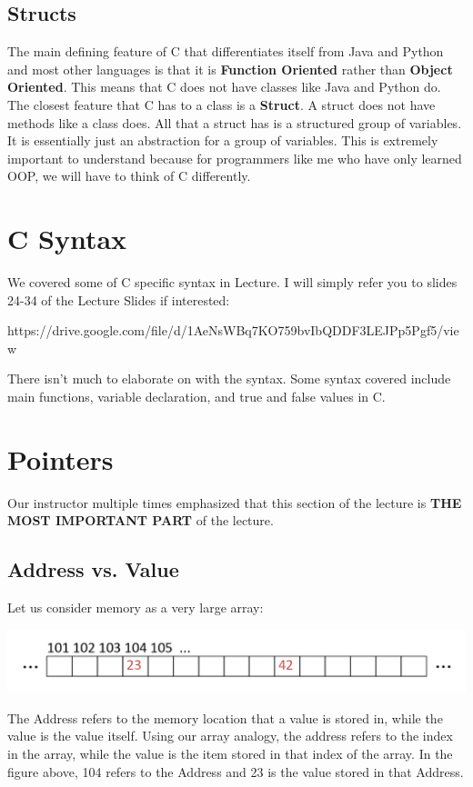 \documentclass[letterpaper]{article}
\theoremstyle{remark}
\begin{document}
\subsection{Structs}
The main defining feature of C that differentiates itself from Java and Python and most other languages is that it is \textbf{Function Oriented} rather than \textbf{Object Oriented}. This means that C does not have classes like Java and Python do. The closest feature that C has to a class is a \textbf{Struct}. A struct does not have methods like a class does. All that a struct has is a structured group of variables. It is essentially just an abstraction for a group of variables. This is extremely important to understand because for programmers like me who have only learned OOP, we will have to think of C differently.

\section{C Syntax}
We covered some of C specific syntax in Lecture. I will simply refer you to slides 24-34 of the Lecture Slides if interested: 

https://drive.google.com/file/d/1AeNsWBq7KO759bvIbQDDF3LEJPp5Pgf5/view 

There isn't much to elaborate on with the syntax. Some syntax covered include main functions, variable declaration, and true and false values in C.

\section{Pointers}
Our instructor multiple times emphasized that this section of the lecture is \textbf{THE MOST IMPORTANT PART} of the lecture.

\subsection{Address vs. Value}
Let us consider memory as a very large array:

\includegraphics[scale=.5]{Address}

The Address refers to the memory location that a value is stored in, while the value is the value itself. Using our array analogy, the address refers to the index in the array, while the value is the item stored in that index of the array. In the figure above, 104 refers to the Address and 23 is the value stored in that Address. 
\end{document}
